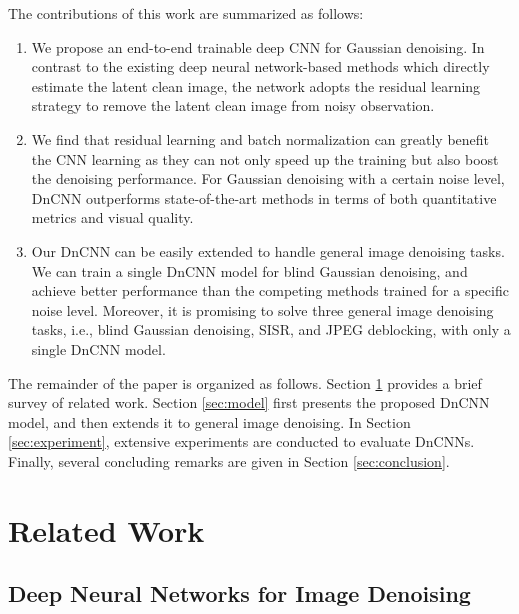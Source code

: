 \documentclass[journal]{IEEEtran}
\begin{document}
The contributions of this work are summarized as follows:
\begin{enumerate}
  \item We propose an end-to-end trainable deep CNN for Gaussian denoising. In contrast to the existing deep neural network-based methods which directly estimate the latent clean image, the network adopts the residual learning strategy to remove the latent clean image from noisy observation.
  \item We find that residual learning and batch normalization can greatly benefit the CNN learning as they can not only speed up the training but also boost the denoising performance. For Gaussian denoising with a certain noise level, DnCNN outperforms state-of-the-art methods in terms of both quantitative metrics and visual quality.
  \item Our DnCNN can be easily extended to handle general image denoising tasks. We can train a single DnCNN model for blind Gaussian denoising, and achieve better performance than the competing methods trained for a specific noise level. Moreover, it is promising to solve three general image denoising tasks, i.e., blind Gaussian denoising, SISR, and JPEG deblocking, with only a single DnCNN model.

\end{enumerate}


The remainder of the paper is organized as follows. Section \ref{sec:related} provides a brief survey of related work. Section \ref{sec:model} first presents the proposed DnCNN model, and then extends it to general image denoising. In Section \ref{sec:experiment}, extensive experiments are conducted to evaluate DnCNNs. Finally, several concluding remarks are given in Section \ref{sec:conclusion}.


\section{Related Work}\label{sec:related}


\subsection{Deep Neural Networks for Image Denoising}
\end{document}

